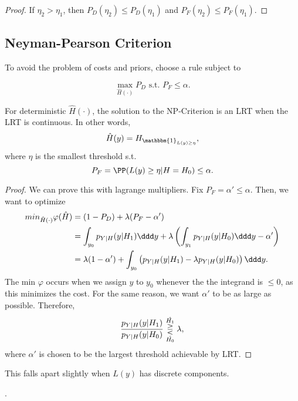 \begin{proof}
If $\eta_2 > \eta_1$, then $P_D(\eta_2)\leq P_D(\eta_1)$ and $P_F(\eta_2)\leq P_F(\eta_1)$.
\end{proof}

\subsection{Neyman-Pearson Criterion}

To avoid the problem of costs and priors, choose a rule subject to

\[\max_{\hat{H}(\cdot)}P_D \text{ s.t. }P_F\leq \alpha.\] 

\begin{theorem}

For deterministic $\hat{H}(\cdot)$, the solution to the NP-Criterion is an LRT when the LRT is continuous. In other words, 
\[\hat{H}(y) = H_{\mathbbm{1}_{L(y)\geq \eta}},\] 
where $\eta$ is the smallest threshold s.t. 
\[P_F = \PP(L(y)\geq \eta | H=H_0)\leq \alpha.\] 
\end{theorem}

\begin{proof}
We can prove this with lagrange multipliers. Fix $P_F = \alpha' \leq \alpha$. Then, we want to optimize
\begin{align*}
	min_{\hat{H}(\cdot)} \varphi(\hat{H}) &= (1-P_D) + \lambda(P_F-\alpha') \\
	&= \int_{y_0}p_{Y|H}(y|H_1)\ddd y + \lambda \left( \int_{y_1}p_{Y|H}(y|H_0)\ddd y - \alpha' \right) \\
	&= \lambda(1-\alpha') + \int_{y_0}\left(p_{Y|H}(y|H_1) - \lambda p_{Y|H}(y|H_0)\right) \ddd y.
\end{align*}
The min $\varphi$ occurs when we assign $y$ to $y_0$ whenever the the integrand is $\leq 0$, as this minimizes the cost. For the same reason, we want $\alpha'$ to be as large as possible. Therefore, 
\[\frac{p_{Y|H}(y|H_1)}{p_{Y|H}(y|H_0)}\overunderset{\hat{H_1}}{\hat{H_0}}{\gtreqless}\lambda,\]
where $\alpha'$ is chosen to be the largest threshold achievable by LRT. 
\end{proof}

This falls apart slightly when $L(y)$ has discrete components. 

\begin{example}

.
\end{example}


